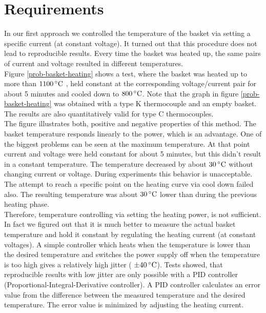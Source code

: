 \documentclass[parskip,12pt,headsepline,a4paper] {scrbook}
\begin{document}
\section{Requirements}
\label{chap:requirements}
\vspace{-0.5\baselineskip}
In our first approach we controlled the temperature of the basket via setting a specific current (at constant voltage). It turned out that this procedure does not lead to reproducible results. Every time the basket was heated up, the same pairs of current and voltage resulted in different temperatures. \\
Figure \ref{prob-basket-heating} shows a test, where the basket was heated up to more than $\unit[1100]{^\circ C}$ , held constant at the corresponding voltage/current pair for about 5 minutes and cooled down to $\unit[800]{^\circ C}$. Note that the graph in figure \ref{prob-basket-heating} was obtained with a type K thermocouple and an empty basket. The results are also quantitatively valid for type C thermocouples. \\
The figure illustrates both, positive and negative properties of this method. The basket temperature responds linearly to the power, which is an advantage. One of the biggest problems can be seen at the maximum temperature. At that point current and voltage were held constant for about 5 minutes, but this didn't result in a constant temperature. The temperature decreased by about $\unit[30]{^\circ C}$ without changing current or voltage. During experiments this behavior is unacceptable.
The attempt to reach a specific point on the heating curve via cool down failed also. The resulting temperature was about $\unit[30]{^\circ C}$ lower than during the previous heating phase. \\
Therefore, temperature controlling via setting the heating power, is not sufficient. In fact we figured out that it is much better to measure the actual basket temperature and hold it constant by regulating the heating current (at constant voltages). A simple controller which heats when the temperature is lower than the desired temperature and switches the power supply off when the temperature is too high gives a relatively high jitter ( $\pm \unit[40]{^\circ C}$). Tests showed, that reproducible results with low jitter are only possible with a PID controller (Proportional-Integral-Derivative controller). A PID controller calculates an error value from the difference between the measured temperature and the desired temperature. The error value is minimized by adjusting the heating current.
\end{document}
